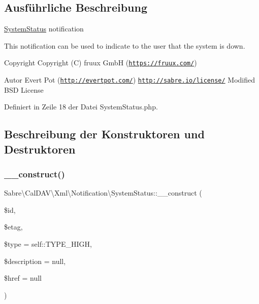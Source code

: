 \subsection{Ausführliche Beschreibung}
\mbox{\hyperlink{class_sabre_1_1_cal_d_a_v_1_1_xml_1_1_notification_1_1_system_status}{System\+Status}} notification

This notification can be used to indicate to the user that the system is down.

\begin{DoxyCopyright}{Copyright}
Copyright (C) fruux GmbH (\href{https://fruux.com/}{\tt https\+://fruux.\+com/}) 
\end{DoxyCopyright}
\begin{DoxyAuthor}{Autor}
Evert Pot (\href{http://evertpot.com/}{\tt http\+://evertpot.\+com/})  \href{http://sabre.io/license/}{\tt http\+://sabre.\+io/license/} Modified B\+SD License 
\end{DoxyAuthor}


Definiert in Zeile 18 der Datei System\+Status.\+php.



\subsection{Beschreibung der Konstruktoren und Destruktoren}
\mbox{\label{class_sabre_1_1_cal_d_a_v_1_1_xml_1_1_notification_1_1_system_status_a4a68e3958dea67caf3a44d0a9f250e7a}} 
\subsubsection{\texorpdfstring{\+\_\+\+\_\+construct()}{\_\_construct()}}
{\footnotesize\ttfamily Sabre\textbackslash{}\+Cal\+D\+A\+V\textbackslash{}\+Xml\textbackslash{}\+Notification\textbackslash{}\+System\+Status\+::\+\_\+\+\_\+construct (\begin{DoxyParamCaption}\item[{}]{\$id,  }\item[{}]{\$etag,  }\item[{}]{\$type = {\ttfamily self\+:\+:TYPE\+\_\+HIGH},  }\item[{}]{\$description = {\ttfamily null},  }\item[{}]{\$href = {\ttfamily null} }\end{DoxyParamCaption})}

